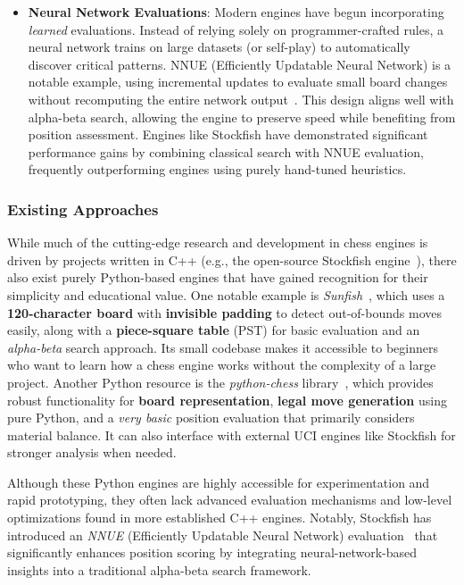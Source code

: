 \documentclass[12pt,a4paper]{article}
\begin{document}
\begin{itemize}
  \item \textbf{Neural Network Evaluations}:  
  Modern engines have begun incorporating \emph{learned} evaluations. Instead of relying solely on programmer-crafted rules, a neural network trains on large datasets (or self-play) to automatically discover critical patterns. NNUE (Efficiently Updatable Neural Network) is a notable example, using incremental updates to evaluate small board changes without recomputing the entire network output~\cite{Nasu2018}. This design aligns well with alpha-beta search, allowing the engine to preserve speed while benefiting from  
  position assessment. Engines like Stockfish have demonstrated significant performance gains by combining classical search with NNUE evaluation, frequently outperforming engines using purely hand-tuned heuristics.
\end{itemize}


\subsubsection{Existing Approaches}
\label{subsec:existing-approaches}

While much of the cutting-edge research and development in chess engines is
driven by projects written in C++ (e.g., the open-source Stockfish
engine~\cite{stockfish}), there also exist purely Python-based engines that
have gained recognition for their simplicity and educational value. One notable
example is \emph{Sunfish}~\cite{sunfish}, which uses a \textbf{120-character board}
with \textbf{invisible padding} to detect out-of-bounds moves easily, along with a
\textbf{piece-square table} (PST) for basic evaluation and an \emph{alpha-beta}
search approach. Its small codebase makes it accessible to beginners who want
to learn how a chess engine works without the complexity of a large project.
Another Python resource is the \emph{python-chess} library~\cite{python-chess},
which provides robust functionality for \textbf{board representation}, 
\textbf{legal move generation} using pure Python, and a \emph{very basic} 
position evaluation that primarily considers material balance. It can also 
interface with external UCI engines like Stockfish for stronger analysis 
when needed.

Although these Python engines are highly accessible for experimentation and
rapid prototyping, they often lack advanced evaluation mechanisms and
low-level optimizations found in more established C++ engines. Notably,
Stockfish has introduced an \emph{NNUE} (Efficiently Updatable Neural Network)
evaluation~\cite{nnue-stockfish} that significantly enhances position scoring
by integrating neural-network-based insights into a traditional alpha-beta
search framework.
\end{document}
